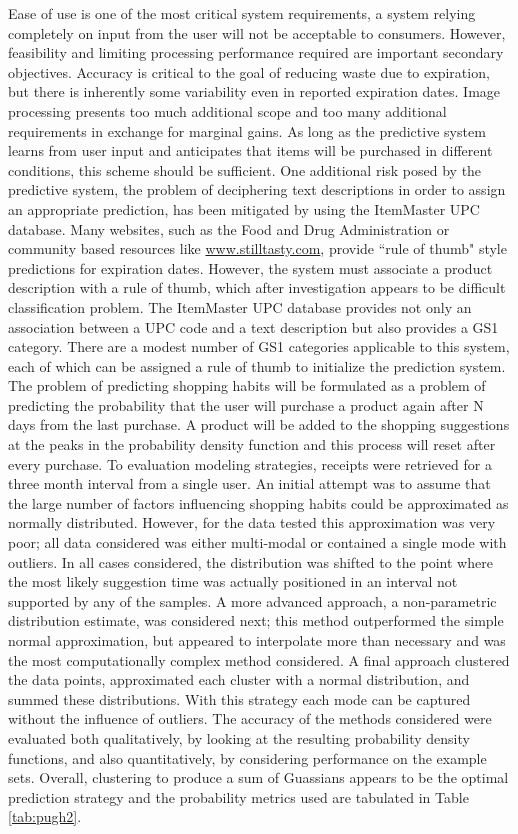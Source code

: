 \documentclass[11pt,letterpaper]{article}
\begin{document}
Ease of use is one of the most critical system requirements, a system relying completely on input from the user will not be acceptable to consumers. However, feasibility and limiting processing performance required are important secondary objectives. Accuracy is critical to the goal of reducing waste due to expiration, but there is inherently some variability even in reported expiration dates. Image processing presents too much additional scope and too many additional requirements in exchange for marginal gains. As long as the predictive system learns from user input and anticipates that items will be purchased in different conditions, this scheme should be sufficient. One additional risk posed by the predictive system, the problem of deciphering text descriptions in order to assign an appropriate prediction, has been mitigated by using the ItemMaster UPC database. Many websites, such as the Food and Drug Administration or community based resources like \url{www.stilltasty.com}, provide ``rule of thumb" style predictions for expiration dates. However, the system must associate a product description with a rule of thumb, which after investigation appears to be difficult classification problem. The ItemMaster UPC database provides not only an association between a UPC code and a text description but also provides a GS1 category. There are a modest number of GS1 categories applicable to this system, each of which can be assigned a rule of thumb to initialize the prediction system.
\newline \quad \newline
The problem of predicting shopping habits will be formulated as a problem of predicting the probability that the user will purchase a product again after N days from the last purchase. A product will be added to the shopping suggestions at the peaks in the probability density function and this process will reset after every purchase. To evaluation modeling strategies, receipts were retrieved for a three month interval from a single user. An initial attempt was to assume that the large number of factors influencing shopping habits could be approximated as normally distributed. However, for the data tested this approximation was very poor; all data considered was either multi-modal or contained a single mode with outliers. In all cases considered, the distribution was shifted to the point where the most likely suggestion time was actually positioned in an interval not supported by any of the samples. A more advanced approach, a non-parametric distribution estimate, was considered next; this method outperformed the simple normal approximation, but appeared to interpolate more than necessary and was the most computationally complex method considered. A final approach clustered the data points, approximated each cluster with a normal distribution, and summed these distributions. With this strategy each mode can be captured without the influence of outliers. The accuracy of the methods considered were evaluated both qualitatively, by looking at the resulting probability density functions, and also quantitatively, by considering performance on the example sets. Overall, clustering to produce a sum of Guassians appears to be the optimal prediction strategy and the probability metrics used are tabulated in Table \ref{tab:pugh2}. 
\end{document}
